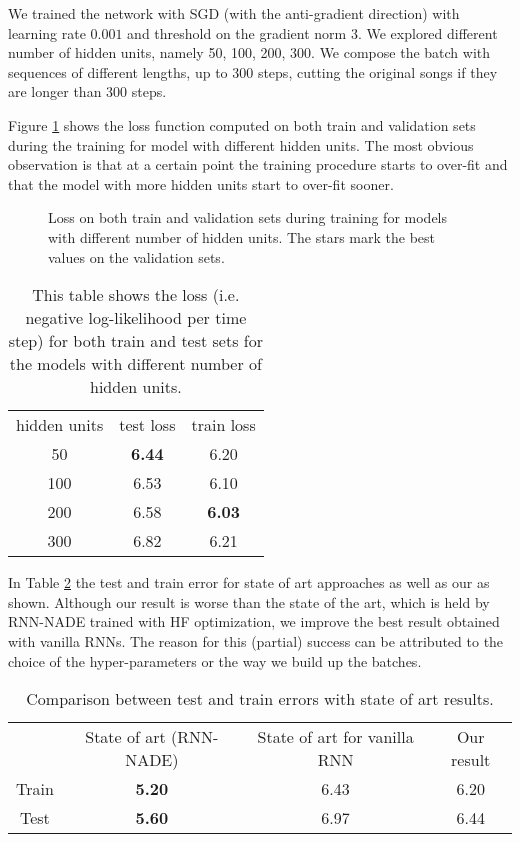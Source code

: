 We trained the network with SGD (with the anti-gradient direction) with learning rate $0.001$ and threshold on the gradient norm $3$. We explored different number of hidden units, namely 50, 100, 200, 300. We compose the batch with sequences of different lengths, up to 300 steps, cutting the original songs if they are longer than 300 steps.

Figure \ref{fig:overfitting_muse} shows the loss function computed on both train and validation sets during the training for model with different hidden units. The most obvious observation is that at a certain point the training procedure starts to over-fit and that the model with more hidden units start to over-fit sooner.

\begin{figure}
	\centering
\resizebox{12cm}{!}{
	
}
\caption{Loss on both train and validation sets during training for models with different number of hidden units. The stars mark the best values on the validation sets.}
\label{fig:overfitting_muse}
\end{figure}

\begin{table}
	\centering
\begin{tabular}{c | c | c}
	hidden units & test loss & train loss \\
	50 & \textbf{6.44} & 6.20  \\
	100 & 6.53 & 6.10 \\
	200 & 6.58 & \textbf{6.03} \\
	300 & 6.82 & 6.21 \\
\end{tabular}
\caption{This table shows the loss (i.e. negative log-likelihood per time step) for both train and test sets for the models with different number of hidden units.}
\label{table:losses_n_hidden}
\end{table}

In Table \ref{table:muse_state_of_art} the test and train error for state of art approaches as well as our as shown. Although our result is worse than the state of the art, which is held by RNN-NADE\cite{BoulangerMuse} trained with HF optimization,  we improve the best result obtained with vanilla RNNs. The reason for this (partial) success can be attributed to the choice of the hyper-parameters or the way we build up the batches.

\begin{table}
	\centering
	\begin{tabular}{c | c | c | c}
		& State of art (RNN-NADE) & State of art for vanilla RNN & Our result\\
		Train & \textbf{5.20} & 6.43 & 6.20\\
		Test & \textbf{5.60} & 6.97 & 6.44\\
	\end{tabular}
	\caption{Comparison between test and train errors with state of art results.}
	\label{table:muse_state_of_art}
	
\end{table}


